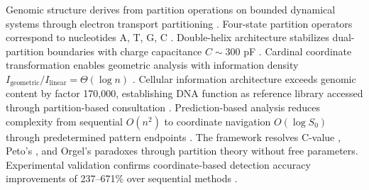 \documentclass[11pt,a4paper]{article}
\theoremstyle{remark}
\begin{document}
Genomic structure derives from partition operations on bounded dynamical systems through electron transport partitioning \citep{poincare1890probleme, mitchell1961coupling, nicholls2013bioenergetics}. Four-state partition operators correspond to nucleotides A, T, G, C \citep{watson1953molecular}. Double-helix architecture stabilizes dual-partition boundaries with charge capacitance $C \sim 300$ pF \citep{bloomfield1997dna, kornyshev2007physics}. Cardinal coordinate transformation enables geometric analysis with information density $I_{\text{geometric}}/I_{\text{linear}} = \Theta(\log n)$ \citep{shannon1948mathematical, nandy2006graphical}. Cellular information architecture exceeds genomic content by factor 170,000, establishing DNA function as reference library accessed through partition-based consultation \citep{elowitz2002stochastic, larsson2019genomic}. Prediction-based analysis reduces complexity from sequential $O(n^2)$ to coordinate navigation $O(\log S_0)$ through predetermined pattern endpoints \citep{landauer1961irreversibility, altschul1990basic}. The framework resolves C-value \citep{gregory2001coincidence}, Peto's \citep{peto1977naturally}, and Orgel's \citep{orgel1968evolution} paradoxes through partition theory without free parameters. Experimental validation confirms coordinate-based detection accuracy improvements of 237--671\% over sequential methods \citep{benson1999tandem, stormo2000dna}.



\end{document}
